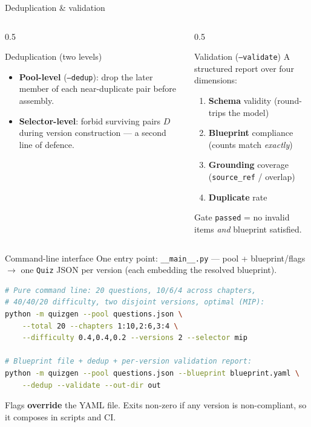 \documentclass[11pt,aspectratio=169]{beamer}
\newcommand{\code}[1]{\texttt{\small #1}}
\newcommand{\pkg}[1]{\texttt{\small #1}}
\begin{document}
\begin{frame}{Deduplication \& validation}
  \begin{columns}[T]
    \begin{column}{0.5\textwidth}
      \begin{block}{Deduplication (two levels)}
        \footnotesize
        \begin{itemize}
          \item \textbf{Pool-level} (\code{--dedup}): drop the later member of
                each near-duplicate pair before assembly.
          \item \textbf{Selector-level}: forbid surviving pairs $D$ during
                version construction — a second line of defence.
        \end{itemize}
      \end{block}
    \end{column}
    \begin{column}{0.5\textwidth}
      \begin{block}{Validation (\code{--validate})}
        \footnotesize A structured report over four dimensions:
        \begin{enumerate}
          \item \textbf{Schema} validity (round-trips the model)
          \item \textbf{Blueprint} compliance (counts match \emph{exactly})
          \item \textbf{Grounding} coverage (\code{source\_ref} / overlap)
          \item \textbf{Duplicate} rate
        \end{enumerate}
        \vspace{1mm}
        Gate \code{passed} = no invalid items \emph{and} blueprint satisfied.
      \end{block}
    \end{column}
  \end{columns}
\end{frame}

\begin{frame}[fragile]{Command-line interface}
  One entry point: \pkg{\_\_main\_\_.py} — pool + blueprint/flags
  $\to$ one \code{Quiz} JSON per version (each embedding the resolved blueprint).
\begin{lstlisting}[language=bash]
# Pure command line: 20 questions, 10/6/4 across chapters,
# 40/40/20 difficulty, two disjoint versions, optimal (MIP):
python -m quizgen --pool questions.json \
    --total 20 --chapters 1:10,2:6,3:4 \
    --difficulty 0.4,0.4,0.2 --versions 2 --selector mip

# Blueprint file + dedup + per-version validation report:
python -m quizgen --pool questions.json --blueprint blueprint.yaml \
    --dedup --validate --out-dir out
\end{lstlisting}
  \footnotesize Flags \textbf{override} the YAML file. Exits non-zero if any
  version is non-compliant, so it composes in scripts and CI.
\end{frame}
\end{document}
